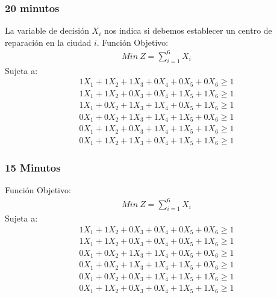 

\begin{homeworkProblem}
\subsubsection{20 minutos}
La variable de decisión $X_i$ nos indica si debemos establecer un centro de reparación en la ciudad $i$.
Función Objetivo:
\begin{align*}
   Min\ Z = \sum_{i=1}^{6}{X_i} 
\end{align*}
Sujeta a:
\begin{align*}
    1X_1+1X_2+1X_3+0X_4+0X_5+0X_6 \geq 1\\
    1X_1+1X_2+0X_3+0X_4+1X_5+1X_6 \geq 1\\
    1X_1+0X_2+1X_3+1X_4+0X_5+1X_6 \geq 1\\
    0X_1+0X_2+1X_3+1X_4+1X_5+0X_6 \geq 1\\
    0X_1+1X_2+0X_3+1X_4+1X_5+1X_6 \geq 1\\
    0X_1+1X_2+1X_3+0X_4+1X_5+1X_6 \geq 1
\end{align*}
\subsubsection{15 Minutos}
Función Objetivo:
\begin{align*}
   Min\ Z = \sum_{i=1}^{6}{X_i} 
\end{align*}
Sujeta a:
\begin{align*}
    1X_1+1X_2+0X_3+0X_4+0X_5+0X_6 \geq 1\\
    1X_1+1X_2+0X_3+0X_4+0X_5+1X_6 \geq 1\\
    0X_1+0X_2+1X_3+1X_4+0X_5+0X_6 \geq 1\\
    0X_1+0X_2+1X_3+1X_4+1X_5+0X_6 \geq 1\\
    0X_1+0X_2+0X_3+1X_4+1X_5+1X_6 \geq 1\\
    0X_1+1X_2+0X_3+0X_4+1X_5+1X_6 \geq 1
\end{align*}
\end{homeworkProblem}


